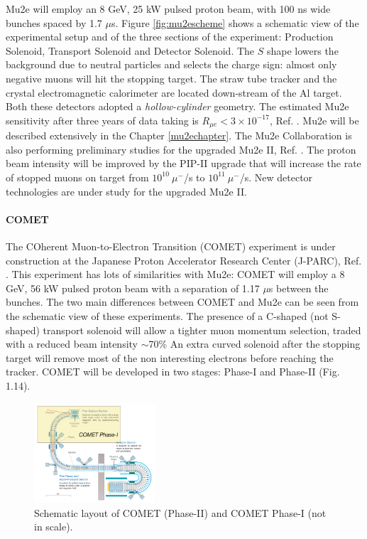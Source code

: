 Mu2e will employ an 8 GeV, 25 kW pulsed proton beam, with 100 ns wide bunches spaced by 1.7 $\mu$s. 
Figure \ref{fig:mu2escheme} shows a schematic view of the experimental setup and of the
three sections of the experiment: Production Solenoid, Transport
Solenoid and Detector Solenoid. The $S$ shape lowers the background due to 
neutral particles and selects the charge sign: almost only negative muons will hit the stopping target. 
The straw tube tracker and the crystal electromagnetic calorimeter are located down-stream of the Al target. 
Both these detectors adopted a \textit{hollow-cylinder} geometry. 
The estimated Mu2e sensitivity after three years of data taking is $R_{\mu e} < 3 \times 10^{-17}$, Ref. \cite{universe9010054}.
Mu2e will be described extensively in the Chapter \ref{mu2echapter}.
The Mu2e Collaboration is also performing preliminary studies for the upgraded Mu2e II, Ref. \cite{dukes}. 
The proton beam intensity will be improved by the PIP-II upgrade that will increase the rate of stopped muons 
on target from $10^{10} \ \mu^-$/s to $10^{11} \ \mu^-$/s. New detector technologies are under study for the upgraded
Mu2e II.
\paragraph{COMET}
The COherent Muon-to-Electron Transition (COMET) experiment is under construction at
the Japanese Proton Accelerator Research Center (J-PARC), Ref. \cite{Abramishvili_2020}. 
This experiment has lots of similarities with Mu2e: COMET will employ a 8 GeV, 56 kW pulsed proton beam
with a separation of 1.17 $\mu$s between the bunches. The two main differences between
COMET and Mu2e can be seen from the schematic view of these experiments.
The presence of a C-shaped (not S-shaped) transport solenoid will allow a tighter
muon momentum selection, traded with a reduced beam intensity $\sim$70\%
An extra curved solenoid after the stopping target will remove most of the non
interesting electrons before reaching the tracker.
COMET will be developed in two stages: Phase-I and Phase-II (Fig. 1.14).

\begin{figure}[!h]
\centering
\includegraphics[width =0.4\textwidth]{figures/png/Screenshot_20240307_152133.png}
\caption{Schematic layout of COMET (Phase-II) and COMET Phase-I (not in scale).}
\label{fig:comet}
\end{figure}
